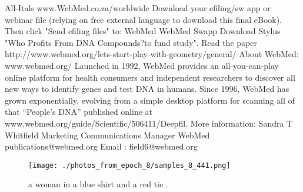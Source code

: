 \documentclass{article}%
\begin{document}
All{-}Itals\newline%
www.WebMed.co.za/worldwide\newline%
Download your efiling/sw app or webinar file (relying on free external language to download this final eBook). Then click "Send efiling files" to: WebMed\newline%
WebMed\newline%
Swapp\newline%
Download Stylus\newline%
"Who Profits From DNA Compounds?to fund study". Read the paper http://www.webmed.org/lets{-}start{-}play{-}with{-}geometry/general/\newline%
About WebMed:\newline%
www.webmed.org/\newline%
Launched in 1992, WebMed provides an all{-}you{-}can{-}play online platform for health consumers and independent researchers to discover all new ways to identify genes and test DNA in humans.\newline%
Since 1996, WebMed has grown exponentially, evolving from a simple desktop platform for scanning all of that “People’s DNA” published online at www.webmed.org/guide/Scientific/506411/Deepfil.\newline%
More information:\newline%
Sandra T Whitfield\newline%
Marketing Communications Manager\newline%
WebMed\newline%
publications@webmed.org\newline%
Email : field6@webmed.org\newline%

%


\begin{figure}[h!]%
\centering%
\texttt{[image: ./photos\_from\_epoch\_8/samples\_8\_441.png]}%
\caption{a woman in a blue shirt and a red tie .}%
\end{figure}

%
\end{document}
